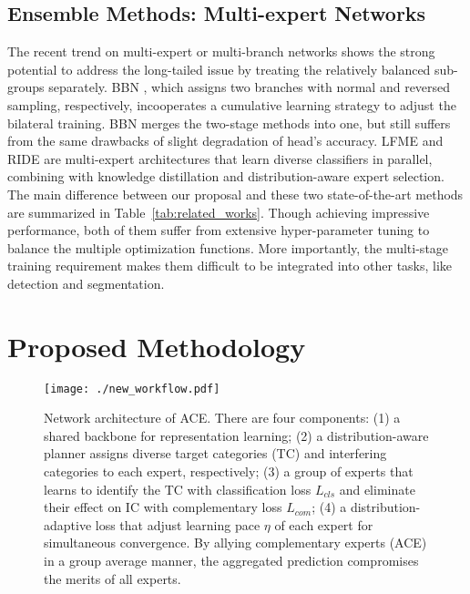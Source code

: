 \subsection{Ensemble Methods: Multi-expert Networks} 
The recent trend on multi-expert or multi-branch networks shows the strong potential to address the long-tailed issue by treating the relatively balanced sub-groups separately. BBN \cite{zhou2020bbn}, which assigns two branches with normal and reversed sampling, respectively, incooperates a cumulative learning strategy to adjust the bilateral training. BBN merges the two-stage methods into one, but still suffers from the same drawbacks of slight degradation of head’s accuracy. LFME \cite{xiang2020learning} and RIDE \cite{wang2020long} are multi-expert architectures that learn diverse classifiers in parallel, combining with knowledge distillation and distribution-aware expert selection. The main difference between our proposal and these two state-of-the-art methods are summarized in Table~\ref{tab:related_works}. Though achieving impressive performance, both of them suffer from extensive hyper-parameter tuning to balance the multiple optimization functions. More importantly, the multi-stage training requirement makes them difficult to be integrated into other tasks, like detection and segmentation.

\section{Proposed Methodology}

\begin{figure*}[t]
\begin{center}
\texttt{[image: ./new\_workflow.pdf]}
\end{center}
   \caption{Network architecture of ACE. There are four components: (1) a shared backbone for representation learning; (2) a distribution-aware planner assigns diverse target categories (TC) and interfering categories to each expert, respectively; (3) a group of experts that learns to identify the TC with classification loss $L_{cls}$ and eliminate their effect on IC with complementary loss $L_{com}$; (4) a distribution-adaptive loss that adjust learning pace $\eta$ of each expert for simultaneous convergence. By allying complementary experts (ACE) in a group average manner, the aggregated prediction compromises the merits of all experts.}
\label{fig:ACE}
\end{figure*}

